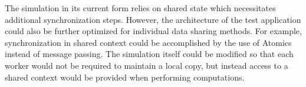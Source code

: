 \documentclass[conference, 9pt]{IEEEtran}
\begin{document}
The simulation in its current form relies on shared state which necessitates additional synchronization steps. However, the architecture of the test application could also be further optimized for individual data sharing methods. For example, synchronization in shared context could be accomplished by the use of Atomics instead of message passing. The simulation itself could be modified so that each worker would not be required to maintain a local copy, but instead access to a shared context would be provided when performing computations.









\printbibliography[title={References}]
\end{document}
